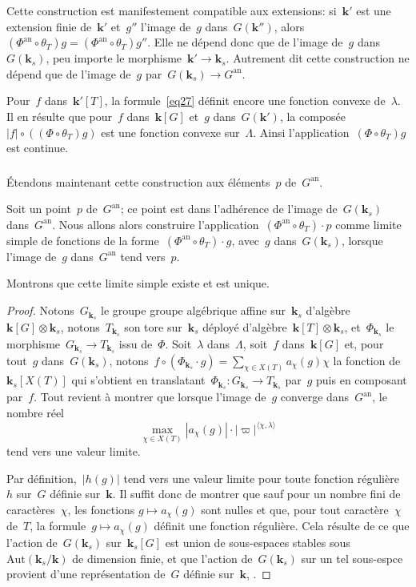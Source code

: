 \documentclass[french]{amsart}
\newcommand{\kk}{\mathbf{k}}
\newcommand{\abs}[1]{{\left|{#1}\right|}}
\newcommand{\an}{\textrm{an}}
\newcommand{\tens}{\mathop{\otimes}}
\begin{document}
Cette construction est manifestement compatible aux extensions: si~$\kk'$ est une extension finie de~$\kk'$ et~$g''$ l'image de~$g$ dans~$G(\kk'')$, alors~$(\Phi^\an\circ\theta_T)g=(\Phi^\an\circ\theta_T)g''$. Elle ne dépend donc que de l'image de~$g$ dans~$G(\kk_s)$, peu importe le morphisme~$\kk'\to\kk_s$. Autrement dit cette construction ne dépend que de l'image de~$g$ par~$G(\kk_s)\to G^\an$.

Pour~$f$ dans~$\kk'[T]$, la formule~\eqref{eq27} définit encore une fonction convexe de~$\lambda$. Il en résulte que pour~$f$ dans~$\kk[G]$ et~$g$ dans~$G(\kk')$, la composée~$\abs{f}\circ((\Phi\circ\theta_T)g)$ est une fonction convexe sur~$\Lambda$. Ainsi l'application~$(\Phi\circ\theta_T)g$ est continue.

\subsubsection{}\label{sectionD42} Étendons maintenant cette construction aux éléments~$p$ de~$G^\an$.

Soit un point~$p$ de~$G^\an$; ce point est dans l'adhérence de l'image de~$G(\kk_s)$ dans~$G^\an$. Nous allons alors construire l'application~$(\Phi^\an\circ\theta_T )\cdot p$ comme limite simple de fonctions
de la forme~$(\Phi^\an\circ\theta_T )\cdot g$, avec~$g$ dans~$G(\kk_s)$, lorsque l'image de~$g$ dans~$G^\an$ tend vers~$p$.

Montrons que cette limite simple existe et est unique.

\begin{proof}
Notons~$G_{\kk_s}$ le groupe groupe algébrique affine sur~$\kk_s$ d'algèbre~$\kk[G]\tens\kk_s$, notons~$T_{\kk_s}$ son tore sur~$\kk_s$ déployé d'algèbre~$\kk[T]\tens\kk_s$, et~$\Phi_{\kk_s}$ le morphisme~$G_{\kk_s}\to T_{\kk_s}$ issu de~$\Phi$. Soit~$\lambda$ dans~$\Lambda$, soit~$f$ dans~$\kk[G]$ et, pour tout~$g$ dans~$G(\kk_s)$, notons~$f\circ(\Phi_{\kk_s}\cdot g)=\sum_{\chi\in X(T)}a_\chi(g)\chi$ la fonction de~$\kk_s[X(T)]$ qui s'obtient en translatant~$\Phi_{\kk_s}:G_{\kk_s}\to T_{\kk_s}$ par~$g$ puis en composant par~$f$. Tout revient à montrer que lorsque l'image
de~$g$ converge dans~$G^\an$, le nombre réel
\[
\max_{\chi\in X(T)}\abs{a_\chi(g)}\cdot\abs{\varpi}^{\langle\chi,\lambda\rangle}
\]
tend vers une valeur limite.

Par définition,~$\abs{h(g )}$ tend vers une valeur limite pour toute fonction régulière~$h$ sur~$G$ définie sur~$\kk$. Il suffit donc de montrer que sauf pour un nombre fini de caractères~$\chi$, les fonctions 
$g\mapsto a_\chi(g)$ sont nulles et que, pour tout caractère~$\chi$ de~$T$, la formule~$g\mapsto a_\chi(g)$ définit une fonction régulière. Cela résulte de ce que l'action de~$G(\kk_s)$ sur~$\kk_s[G]$ est union de sous-espaces stables sous~$\mathrm{Aut}(\kk_s/\kk)$ de dimension finie, et que l'action de~$G(\kk_s)$ sur un tel sous-espce provient d'une représentation de~$G$ définie sur~$\kk$, \cite[1. \S1 1.9]{Bor91}.
\end{proof}
\end{document}
